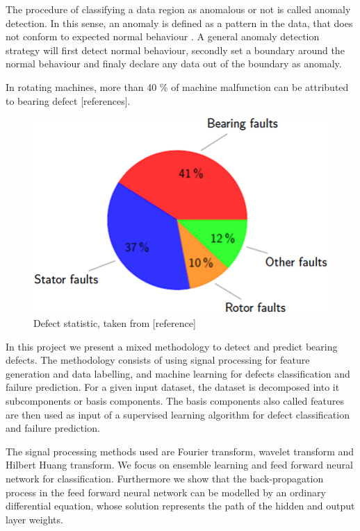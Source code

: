\documentclass[11pt, oneside]{article}   	%
\begin{document}
\begin{flushleft}
The procedure of classifying a data region as anomalous or not is called anomaly detection. In this sense, an anomaly is defined as a pattern in the data, that does not conform to expected normal behaviour \cite{chandola}. A general anomaly detection strategy will first detect normal behaviour, secondly set a boundary around the normal behaviour and finaly declare any data out of the boundary as anomaly.
\end{flushleft}
\begin{flushleft}
In rotating machines, more than 40 $\%$ of machine malfunction can be attributed to bearing defect [references]. 
\end{flushleft}
\begin{figure}[H] %
   \centering
   \includegraphics[width=5in]{pie.png} 
   \caption{Defect statistic, taken from [reference]}
   \label{fig:pie}
\end{figure}
In this project we present a mixed methodology to detect and predict bearing defects. The methodology consists of using signal processing for feature generation and data labelling,  and machine learning for defects classification and failure prediction. For a given input dataset, the dataset is decomposed into it subcomponents or basis components. The basis components also called features are then used as input of a supervised learning algorithm for defect classification and failure prediction.
\begin{flushleft}
The signal processing methods used are Fourier transform, wavelet transform and Hilbert Huang transform. We focus on ensemble learning and feed forward neural network for classification. Furthermore we show that the back-propagation process in the feed forward neural network can be modelled by an ordinary differential equation, whose solution represents the path of the hidden and output layer weights.
\end{flushleft}
\end{document}
